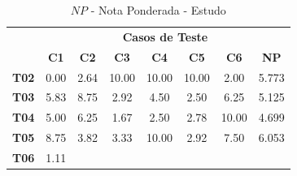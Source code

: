 \begin{table}[htbp]
	\centering
	\caption{$NP$ - Nota Ponderada - Estudo}
	\begin{tabular}{|c|ccccccc|}
		\hline
		\rowcolor[HTML]{D0CECE} 
		\cellcolor[HTML]{D0CECE} &
		\multicolumn{7}{c|}{\cellcolor[HTML]{D0CECE}\textbf{Casos   de Teste}} \\ \cline{2-8} 
		\rowcolor[HTML]{D9D9D9} 
		\multirow{-2}{*}{\cellcolor[HTML]{D0CECE}\textbf{Participante}} &
		\multicolumn{1}{c|}{\cellcolor[HTML]{D9D9D9}\textbf{C1}} &
		\multicolumn{1}{c|}{\cellcolor[HTML]{D9D9D9}\textbf{C2}} &
		\multicolumn{1}{c|}{\cellcolor[HTML]{D9D9D9}\textbf{C3}} &
		\multicolumn{1}{c|}{\cellcolor[HTML]{D9D9D9}\textbf{C4}} &
		\multicolumn{1}{c|}{\cellcolor[HTML]{D9D9D9}\textbf{C5}} &
		\multicolumn{1}{c|}{\cellcolor[HTML]{D9D9D9}\textbf{C6}} &
		\textbf{NP} \\ \hline
		\textbf{T02} &
		\multicolumn{1}{c|}{\cellcolor[HTML]{FFFFFF}0.00} &
		\multicolumn{1}{c|}{\cellcolor[HTML]{FFFFFF}2.64} &
		\multicolumn{1}{c|}{\cellcolor[HTML]{FFFFFF}10.00} &
		\multicolumn{1}{c|}{\cellcolor[HTML]{FFFFFF}10.00} &
		\multicolumn{1}{c|}{\cellcolor[HTML]{FFFFFF}10.00} &
		\multicolumn{1}{c|}{\cellcolor[HTML]{FFFFFF}2.00} &
		5.773 \\ \hline
		\rowcolor[HTML]{F2F2F2} 
		\textbf{T03} &
		\multicolumn{1}{c|}{\cellcolor[HTML]{F2F2F2}5.83} &
		\multicolumn{1}{c|}{\cellcolor[HTML]{F2F2F2}8.75} &
		\multicolumn{1}{c|}{\cellcolor[HTML]{F2F2F2}2.92} &
		\multicolumn{1}{c|}{\cellcolor[HTML]{F2F2F2}4.50} &
		\multicolumn{1}{c|}{\cellcolor[HTML]{F2F2F2}2.50} &
		\multicolumn{1}{c|}{\cellcolor[HTML]{F2F2F2}6.25} &
		5.125 \\ \hline
		\textbf{T04} &
		\multicolumn{1}{c|}{\cellcolor[HTML]{FFFFFF}5.00} &
		\multicolumn{1}{c|}{\cellcolor[HTML]{FFFFFF}6.25} &
		\multicolumn{1}{c|}{\cellcolor[HTML]{FFFFFF}1.67} &
		\multicolumn{1}{c|}{\cellcolor[HTML]{FFFFFF}2.50} &
		\multicolumn{1}{c|}{\cellcolor[HTML]{FFFFFF}2.78} &
		\multicolumn{1}{c|}{\cellcolor[HTML]{FFFFFF}10.00} &
		4.699 \\ \hline
		\rowcolor[HTML]{F2F2F2} 
		\textbf{T05} &
		\multicolumn{1}{c|}{\cellcolor[HTML]{F2F2F2}8.75} &
		\multicolumn{1}{c|}{\cellcolor[HTML]{F2F2F2}3.82} &
		\multicolumn{1}{c|}{\cellcolor[HTML]{F2F2F2}3.33} &
		\multicolumn{1}{c|}{\cellcolor[HTML]{F2F2F2}10.00} &
		\multicolumn{1}{c|}{\cellcolor[HTML]{F2F2F2}2.92} &
		\multicolumn{1}{c|}{\cellcolor[HTML]{F2F2F2}7.50} &
		6.053 \\ \hline
		\textbf{T06} &
		\multicolumn{1}{c|}{\cellcolor[HTML]{FFFFFF}1.11} &

\end{tabular}
\end{table}
